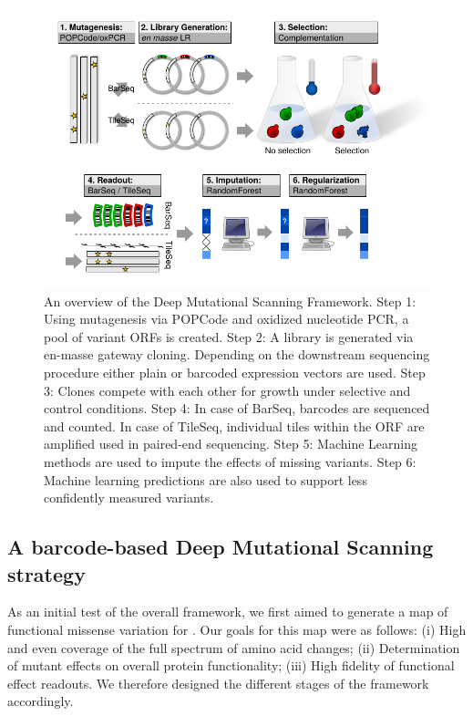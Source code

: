 \begin{figure}[h!]
	\centering
	\includegraphics[width=\textwidth]{img/framework_flowchart.pdf}
	\caption{An overview of the Deep Mutational Scanning Framework. Step 1: Using mutagenesis via POPCode and oxidized nucleotide PCR, a pool of variant ORFs is created. Step 2: A library is generated via en-masse gateway cloning. Depending on the downstream sequencing procedure either plain or barcoded expression vectors are used. Step 3: Clones compete with each other for growth under selective and control conditions. Step 4: In case of BarSeq, barcodes are sequenced and counted. In case of TileSeq, individual tiles within the ORF are amplified used in paired-end sequencing. Step 5: Machine Learning methods are used to impute the effects of missing variants. Step 6: Machine learning predictions are also used to support less confidently measured variants. }
	\label{fig:framework}
\end{figure}


\subsection{A barcode-based Deep Mutational Scanning strategy}


As an initial test of the overall framework, we first aimed to generate a map of functional missense variation for . Our goals for this map were as follows: (i) High and even coverage of the full spectrum of amino acid changes; (ii) Determination of mutant effects on overall protein functionality; (iii) High fidelity of functional effect readouts. We therefore designed the different stages of the framework accordingly. 

